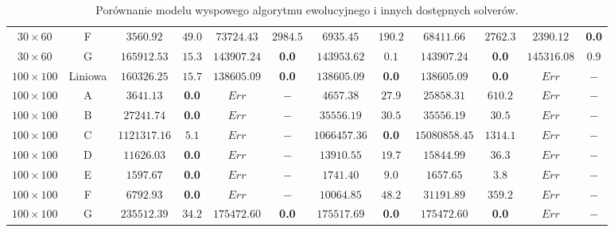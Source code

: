 \begin{table}[H]
\begin{center}
{\begin{tabular}{c|c||c|c||c|c||c|c||c|c||c|c}
            $30 \times 60$ & F           & $3560.92$ & $49.0$                    & $73724.43$ & $2984.5$      & $6935.45$ & $190.2$       & $68411.66$ & $2762.3$     & $2390.12$ & \textbf{0.0} \\
            $30 \times 60$ & G           & $165912.53$ & $15.3$                  & $143907.24$ & \textbf{0.0}        & $143953.62$ & $0.1$       & $143907.24$ & \textbf{0.0}        & $145316.08$ & $0.9$ \\
            \hline
            $100 \times 100$ & Liniowa   & $160326.25$ & $15.7$                  & $138605.09$ & \textbf{0.0}        & $138605.09$ & \textbf{0.0}       & $138605.09$ & \textbf{0.0}       & $Err$ & $-$ \\
            $100 \times 100$ & A         & $3641.13$ & \textbf{0.0}                     & $Err$ & $-$                & $4657.38$ & $27.9$        & $25858.31$ & $610.2$      & $Err$ & $-$ \\
            $100 \times 100$ & B         & $27241.74$ & \textbf{0.0}                    & $Err$ & $-$                & $35556.19$ & $30.5$       & $35556.19$ & $30.5$       & $Err$ & $-$ \\
            $100 \times 100$ & C         & $1121317.16$ & $5.1$                  & $Err$ & $-$                & $1066457.36$ & \textbf{0.0}      & $15080858.45$ & $1314.1$  & $Err$ & $-$ \\
            $100 \times 100$ & D         & $11626.03$ & \textbf{0.0}                    & $Err$ & $-$                & $13910.55$ & $19.7$       & $15844.99$ & $36.3$       & $Err$ & $-$ \\
            $100 \times 100$ & E         & $1597.67$ & \textbf{0.0}                     & $Err$ & $-$                & $1741.40$ & $9.0$        & $1657.65$ & $3.8$         & $Err$ & $-$ \\
            $100 \times 100$ & F         & $6792.93$ & \textbf{0.0}                     & $Err$ & $-$                & $10064.85$ & $48.2$       & $31191.89$ & $359.2$      & $Err$ & $-$ \\
            $100 \times 100$ & G         & $235512.39$ & $34.2$                  & $175472.60$ & \textbf{0.0}        & $175517.69$ & \textbf{0.0}       & $175472.60$ & \textbf{0.0}       & $Err$ & $-$ \\
        \end{tabular}
        }
    \end{center}
    \caption{Porównanie modelu wyspowego algorytmu ewolucyjnego i innych dostępnych solverów.}
    \label{wyniki-3}
\end{table}

